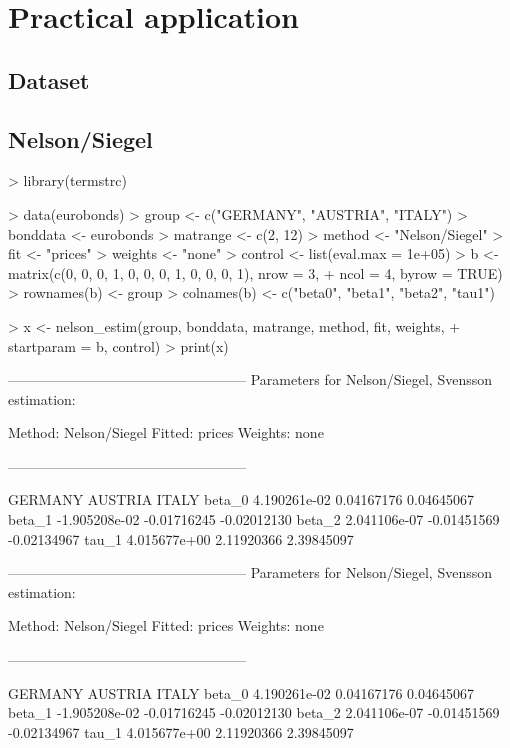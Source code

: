 \section{Practical application}
\label{sec:pract-appl}

\subsection{Dataset}




\subsection{Nelson/Siegel}

\begin{Schunk}
\begin{Sinput}
> library(termstrc)
\end{Sinput}
\end{Schunk}

\begin{Schunk}
\begin{Sinput}
> data(eurobonds)
> group <- c("GERMANY", "AUSTRIA", "ITALY")
> bonddata <- eurobonds
> matrange <- c(2, 12)
> method <- "Nelson/Siegel"
> fit <- "prices"
> weights <- "none"
> control <- list(eval.max = 1e+05)
> b <- matrix(c(0, 0, 0, 1, 0, 0, 0, 1, 0, 0, 0, 1), nrow = 3, 
+     ncol = 4, byrow = TRUE)
> rownames(b) <- group
> colnames(b) <- c("beta0", "beta1", "beta2", "tau1")
\end{Sinput}
\end{Schunk}

\begin{Schunk}
\begin{Sinput}
> x <- nelson_estim(group, bonddata, matrange, method, fit, weights, 
+     startparam = b, control)
> print(x)
\end{Sinput}
\begin{Soutput}
---------------------------------------------------
Parameters for Nelson/Siegel, Svensson estimation:

Method: Nelson/Siegel 
Fitted: prices 
Weights: none 

---------------------------------------------------

             GERMANY     AUSTRIA       ITALY
beta_0  4.190261e-02  0.04167176  0.04645067
beta_1 -1.905208e-02 -0.01716245 -0.02012130
beta_2  2.041106e-07 -0.01451569 -0.02134967
tau_1   4.015677e+00  2.11920366  2.39845097

---------------------------------------------------
Parameters for Nelson/Siegel, Svensson estimation:

Method: Nelson/Siegel 
Fitted: prices 
Weights: none 

---------------------------------------------------

             GERMANY     AUSTRIA       ITALY
beta_0  4.190261e-02  0.04167176  0.04645067
beta_1 -1.905208e-02 -0.01716245 -0.02012130
beta_2  2.041106e-07 -0.01451569 -0.02134967
tau_1   4.015677e+00  2.11920366  2.39845097
\end{Soutput}
\end{Schunk}

